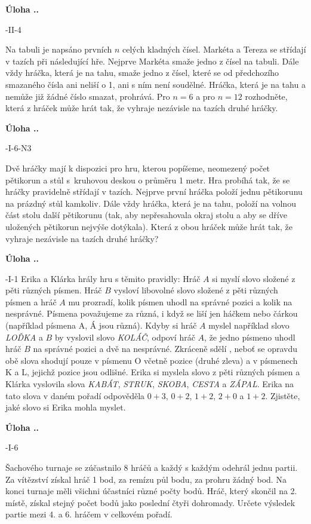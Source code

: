 \documentclass{article}
\newcounter{seminar}
\newcounter{problem}
\newcommand{\source}[1]{
  \def\temp{#1}\ifx\temp\empty
  \else
    [#1]
  \fi
}
\newcommand{\problem}[4]{
  \stepcounter{problem}
  \noindent\textbf{Úloha \theseminar .\theproblem.}
    \source{#1} #3
  \bigskip
}
\begin{document}
\problem{64-II-4}{}{
Na tabuli je napsáno prvních $n$ celých kladných čísel. Markéta a Tereza se střídají v tazích při následující hře. Nejprve Markéta smaže jedno z čísel na tabuli. Dále vždy hráčka, která je na tahu, smaže jedno z čísel, které se od předchozího smazaného čísla ani neliší o 1, ani s ním není soudělné. Hráčka, která je na tahu a nemůže již žádné číslo smazat, prohrává. Pro $n = 6$ a pro $n = 12$ rozhodněte, která z hráček může hrát tak, že vyhraje nezávisle na tazích druhé hráčky.
}{
}

\problem{61-I-6-N3}{}{
Dvě hráčky mají k dispozici pro hru, kterou popíšeme, neomezený počet pětikorun a stůl s~kruhovou deskou o průměru 1 metr. Hra probíhá tak, že se hráčky pravidelně střídají v tazích. Nejprve první hráčka položí jednu pětikorunu na prázdný stůl kamkoliv. Dále vždy hráčka, která je na tahu, položí na volnou část stolu další pětikorunu (tak, aby nepřesahovala okraj stolu a aby se dříve uložených pětikorun nejvýše dotýkala). Která z obou hráček může hrát tak, že vyhraje nezávisle na tazích druhé hráčky?
}{
}

\problem{59-I-1}{}{Erika a Klárka hrály hru  s těmito pravidly: Hráč $A$ si myslí slovo složené z pěti různých písmen. Hráč $B$ vysloví libovolné slovo složené z pěti různých písmen a hráč $A$ mu prozradí, kolik písmen uhodl na správné pozici a kolik na nesprávné. Písmena považujeme za různá, i když se liší jen háčkem nebo čárkou (například písmena A, Á jsou různá). Kdyby si hráč $A$ myslel například slovo \textit{LOĎKA} a $B$ by vyslovil slovo \textit{KOLÁČ}, odpoví hráč $A$, že jedno písmeno uhodl hráč $B$ na správné pozici a dvě na nesprávné. Zkráceně sdělí \uv{1 + 2}, neboť se opravdu obě slova shodují pouze v písmenu O včetně pozice (druhé zleva) a v písmenech K a L, jejichž pozice jsou odlišné. Erika si myslela slovo z pěti různých písmen a Klárka vyslovila slova \textit{KABÁT}, \textit{STRUK}, \textit{SKOBA}, \textit{CESTA} a \textit{ZÁPAL}. Erika na tato slova v daném pořadí odpověděla $0 + 3$, $0 + 2$, $1 + 2$, $2 + 0$ a $1 + 2$. Zjistěte, jaké slovo si Erika mohla myslet.
}{
}

\problem{63-I-6}{}{
Šachového turnaje se zúčastnilo 8 hráčů a každý s každým odehrál jednu partii. Za vítězství získal hráč 1 bod, za remízu půl bodu, za prohru žádný bod. Na konci turnaje měli všichni účastníci různé počty bodů. Hráč, který skončil na 2. místě, získal stejný počet bodů jako poslední čtyři dohromady. Určete výsledek partie mezi 4. a 6. hráčem v celkovém pořadí.
}{
}
\end{document}
